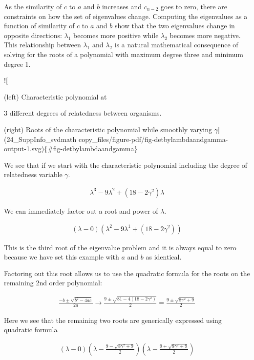 \documentclass[
  letterpaper,
  DIV=11,
  numbers=noendperiod]{scrartcl}
\begin{document}
As the similarity of \(c\) to \(a\) and \(b\) increases and \(c_{n-2}\)
goes to zero, there are constraints on how the set of eigenvalues
change. Computing the eigenvalues as a function of similarity of \(c\)
to \(a\) and \(b\) show that the two eigenvalues change in opposite
directions: \(λ_1\) becomes more positive while \(λ_2\) becomes more
negative. This relationship between \(λ_1\) and \(λ_2\) is a natural
mathematical consequence of solving for the roots of a polynomial with
maximum degree three and minimum degree 1.

!{[}

(left) Characteristic polynomial at

3 different degrees of relatedness between organisms.

(right) Roots of the characteristic polynomial while smoothly varying
\(γ\){]}(24\_SuppInfo\_svdmath
copy\_files/figure-pdf/fig-detbylambdaandgamma-output-1.svg)\{\#fig-detbylambdaandgamma\}

We see that if we start with the characteristic polynomial including the
degree of relatedness variable \(\gamma\).

\begin{align*}
\lambda^3 - 9\lambda^2 + (18 - 2\gamma^2)\lambda
\end{align*}

We can immediately factor out a root and power of \(\lambda\).

\begin{align*}
(\lambda - 0)(\lambda^2 - 9\lambda^1 + (18 - 2\gamma^2))
\end{align*}

This is the third root of the eigenvalue problem and it is always equal
to zero because we have set this example with \(a\) and \(b\) as
identical.

Factoring out this root allows us to use the quadratic formula for the
roots on the remaining 2nd order polynomial:

\begin{align*}
\frac{-b \pm \sqrt{b^2 - 4ac}}{2a} \rightarrow \frac{9 \pm \sqrt{81 - 4(18 - 2\gamma^2)}}{2} = \frac{9 \pm \sqrt{8\gamma^2 + 9}}{2}
\end{align*}

Here we see that the remaining two roots are generically expressed using
quadratic formula

\begin{align*}
(\lambda - 0)\left(\lambda - \frac{9 - \sqrt{8\gamma^2 + 9}}{2}\right)\left(\lambda - \frac{9 + \sqrt{8\gamma^2 + 9}}{2}\right)
\end{align*}
\end{document}
